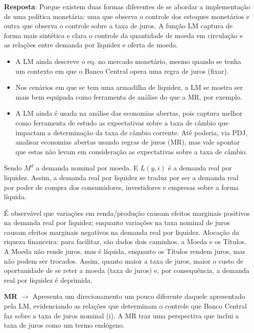 \documentclass[a4paper,12pt]{article}[abntex2]
\begin{document}
\textbf{Resposta}: Porque existem duas formas diferentes de se abordar a implementação de uma política monetária: uma que observa o controle dos estoques monetários e outra que observa o controle sobre a taxa de juros. A função LM captura de forma mais sintética e clara o controle da quantidade de moeda em circulação e as relações entre demanda por liquidez e oferta de moeda. \begin{itemize}
    \item A LM ainda descreve o eq. no mercado monetário, mesmo quando se tenha um contexto em que o Banco Central opera uma regra de juros (fixar). 
    \item Nos cenários em que se tem uma armadilha de liquidez, a LM se mostra ser mais bem equipada como ferramenta de análise do que a MR, por exemplo. 
    \item A LM ainda é usada na análise das economias abertas, pois captura melhor como ferramenta  de  estudo  as  expectativas  sobre  a  taxa  de  câmbio  que  impactam  a determinação da taxa de câmbio corrente. Até poderia, via PDJ, analisar economias abertas  usando  regras  de  juros  (MR),  mas  vale  apontar  que  estas  não  levam  em consideração as expectativas sobre a taxa de câmbio. 
\end{itemize}

Sendo $M^d$ a demanda nominal por moeda. E $L(y,i)$ é a demanda real por liquidez. Assim, a demanda  real  por  liquidez  se  traduz  por  ser  a  demanda  real  por  poder  de  compra  dos consumidores, investidores e empresas sobre a forma líquida. 

É observável que variações em renda/produção causam efeitos marginais positivos na demanda real por liquidez; enquanto variações na taxa nominal de juros causam efeitos marginais negativos na demanda real por liquidez. 
Alocação da riqueza financeira: para facilitar, são dados dois caminhos, a Moeda e os Títulos. A Moeda não rende juros, mas é líquida, enquanto os Títulos rendem juros, mas não podem ser trocados. Assim, quanto maior a taxa de juros, maior o custo de oportunidade de se reter a moeda (taxa de juros) e, por consequência, a demanda real por liquidez é deprimida.  

\textbf{MR} $\rightarrow$ Apresenta um  direcionamento um pouco diferente  daquele  apresentado pela  LM, evidenciando as relações que determinam o controle que Banco Central faz sobre a taxa de juros nominal (i). A MR traz uma perspectiva que inclui a taxa de juros como um termo endógeno.
\end{document}
